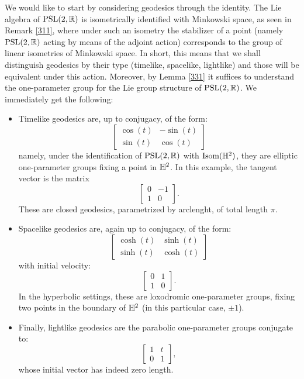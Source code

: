 We would like to start by considering geodesics through the identity. The Lie algebra of $\text{PSL}(2,\mathbb{R})$ is isometrically identified with Minkowski space, as seen in Remark \ref{311}, where under such an isometry the stabilizer of a point (namely $\text{PSL}(2,\mathbb{R})$ acting by means of the adjoint action) corresponds to the group of linear isometries of Minkowski space. In short, this means that we shall distinguish geodesics by their type (timelike, spacelike, lightlike) and those will be equivalent under this action. Moreover, by Lemma \ref{331} it suffices to understand the one-parameter group for the Lie group structure of $\text{PSL}(2,\mathbb{R})$. We immediately get the following:

\begin{itemize}
    \item Timelike geodesics are, up to conjugacy, of the form: 
    \[
    \begin{bmatrix}
    \cos(t) & -\sin(t) \\
    \sin(t) & \cos(t)
     \end{bmatrix}
\]
namely, under the identification of $\text{PSL}(2,\mathbb{R})$ with $\text{Isom}(\mathbb{H}^2)$, they are elliptic one-parameter groups fixing a point in $\mathbb{H}^2$. In this example, the tangent vector is the matrix
\[
    \begin{bmatrix}
    0 & -1 \\
    1 & 0
    \end{bmatrix}.
    \]
These are closed geodesics, parametrized by arclenght, of total length $\pi$. 
\item Spacelike geodesics are, again up to conjugacy, of the form: 
\[
    \begin{bmatrix}
    \cosh(t) & \sinh(t) \\
    \sinh(t) & \cosh(t) \end{bmatrix}
\]
with initial velocity: 
\[
    \begin{bmatrix}
        0 & 1 \\
        1 & 0
    \end{bmatrix}.
\]
In the hyperbolic settings, these are loxodromic one-parameter groups, fixing two points in the boundary of $\mathbb{H}^2$ (in this particular case, $\pm 1$). 
\item Finally, lightlike geodesics are the parabolic one-parameter groups conjugate to: 
\[
    \begin{bmatrix}
        1 & t \\
        0 & 1 
    \end{bmatrix},
\]
whose initial vector has indeed zero length.
\end{itemize}

